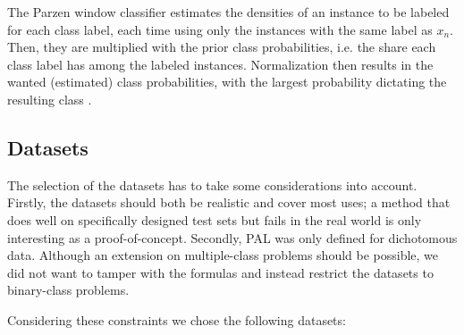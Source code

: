 The Parzen window classifier estimates the densities of an instance to be labeled for each class label, each time using only the instances with the same label as $x_n$. Then, they are multiplied with the prior class probabilities, i.e. the share each class label has among the labeled instances. Normalization then results in the wanted (estimated) class probabilities, with the largest probability dictating the resulting class \cite{ArchambeauEtAl2006}.

\subsection{Datasets}

The selection of the datasets has to take some considerations into account. Firstly, the datasets should both be realistic and cover most uses; a method that does well on specifically designed test sets but fails in the real world is only interesting as a proof-of-concept. Secondly, PAL was only defined for dichotomous data. Although an extension on multiple-class problems should be possible, we did not want to tamper with the formulas and instead restrict the datasets to binary-class problems.

Considering these constraints we chose the following datasets:

